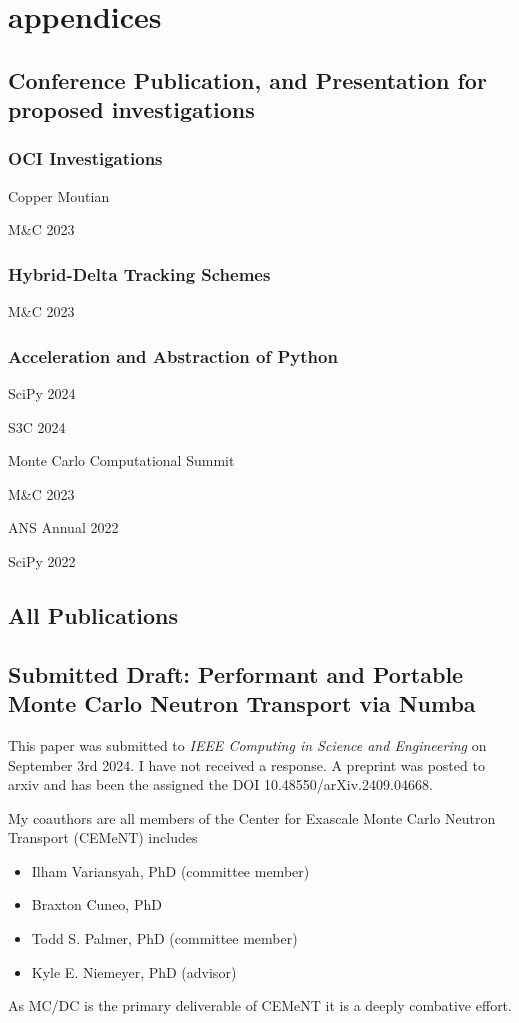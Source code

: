 \chapter{appendices} \label{appA}

\section{Conference Publication, and Presentation for proposed investigations}


\subsection{OCI Investigations}

Copper Moutian

M\&C 2023

\subsection{Hybrid-Delta Tracking Schemes}

M\&C 2023

\subsection{Acceleration and Abstraction of Python}

SciPy 2024

S3C 2024

Monte Carlo Computational Summit

M\&C 2023

ANS Annual 2022

SciPy 2022

\section{All Publications}

\section{Submitted Draft: Performant and Portable\\ Monte Carlo Neutron Transport via Numba}
\label{app:cise}

This paper was submitted to \textit{IEEE Computing in Science and Engineering} on September 3rd 2024. 
I have not received a response.
A preprint was posted to arxiv and has been the assigned the DOI 10.48550/arXiv.2409.04668.

My coauthors are all members of the Center for Exascale Monte Carlo Neutron Transport (CEMeNT) includes
\begin{itemize}
    \item Ilham Variansyah, PhD (committee member)
    \item Braxton Cuneo, PhD
    \item Todd S. Palmer, PhD (committee member)
    \item Kyle E. Niemeyer, PhD (advisor)
\end{itemize}
As MC/DC is the primary deliverable of CEMeNT it is a deeply combative effort.


